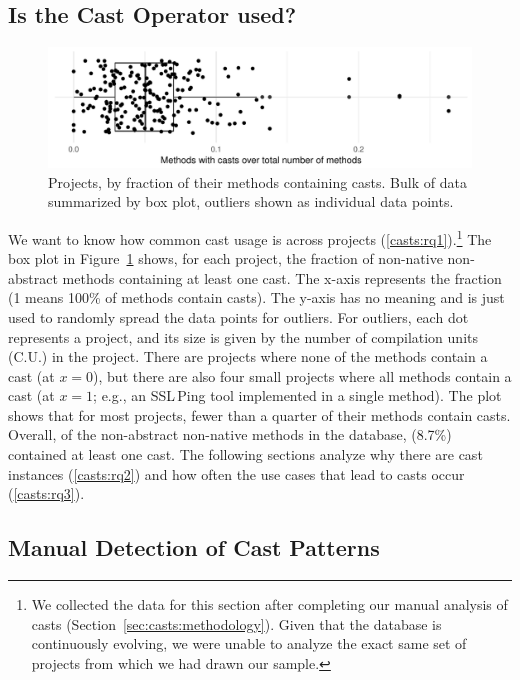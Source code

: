 \subsection{Is the Cast Operator used?}



\begin{figure}[ht!]
  \includegraphics[width=\columnwidth]{analysis/stats-methodwcastXproject.pdf}
  \caption{Projects, by fraction of their methods containing casts. Bulk of data summarized by box plot, outliers shown as individual data points.}
  \label{fig:stats}
\end{figure}

We want to know how common cast usage is across projects (\ref{casts:rq1}).\footnote{
We collected the data for this section after completing our manual analysis of
casts (Section~\ref{sec:casts:methodology}).
Given that the \lgtm{} database is continuously evolving,
we were unable to analyze the exact same set of projects from which we had drawn our sample.
}
The box plot in Figure~\ref{fig:stats} shows, for each project,
the fraction of non-native non-abstract methods containing at least one cast.
The x-axis represents the fraction (1 means 100\% of methods contain casts).
The y-axis has no meaning and is just used to randomly spread the data
points for outliers.
For outliers, each dot represents a project,
and its size is given by the number of compilation units (C.U.) in the project.
There are projects where none of the methods contain a cast (at $x=0$),
but there are also four small projects
where all methods contain a cast (at $x=1$;
e.g., an SSL\,Ping tool implemented in a single method).
The plot shows that for most projects, fewer than a quarter of their
methods contain casts.
Overall, of the \nmethod{} non-abstract non-native methods in the database,
\nmethodwithcast{} (8.7\%) contained at least one cast.
The following sections analyze why there are cast instances (\ref{casts:rq2})
and how often the use cases that lead to casts occur (\ref{casts:rq3}).


\subsection{Manual Detection of Cast Patterns}

